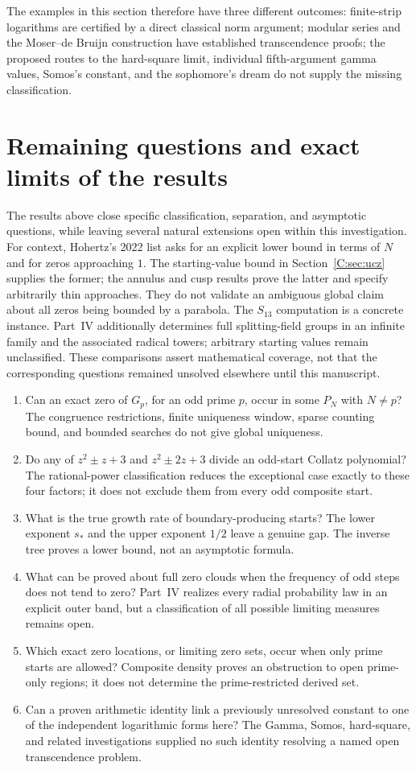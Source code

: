 \documentclass[11pt,a4paper]{article}
\theoremstyle{definition}
\theoremstyle{remark}
\numberwithin{equation}{section}
\begin{document}
The examples in this section therefore have three different outcomes:
finite-strip logarithms are certified by a direct classical norm argument;
modular series and the Moser--de Bruijn construction have established
transcendence proofs; the proposed routes to the hard-square limit,
individual fifth-argument gamma values, Somos's constant, and the
sophomore's dream do not supply the missing classification.


\section{Remaining questions and exact limits of the results}
\label{C:sec:remaining-questions}
The results above close specific classification, separation, and
asymptotic questions, while leaving several natural extensions open
within this investigation.
For context, Hohertz's 2022 list \cite[Section~5]{R005} asks for
an explicit lower bound in terms of $N$ and for zeros approaching $1$.
The starting-value bound in Section~\ref{C:sec:ucz} supplies the former;
the annulus and cusp results prove the latter and specify arbitrarily
thin approaches. They do not validate an ambiguous global claim about
all zeros being bounded by a parabola. The $S_{13}$ computation is a concrete instance. Part~IV additionally determines full splitting-field groups in an infinite family and the associated radical towers; arbitrary starting values remain unclassified. These comparisons assert mathematical coverage,
not that the corresponding questions remained unsolved elsewhere
until this manuscript.
\begin{enumerate}
\item Can an exact zero of $G_p$, for an odd prime $p$, occur in
some $P_N$ with $N\ne p$? The congruence restrictions, finite uniqueness
window, sparse counting bound, and bounded searches do not give global
uniqueness.
\item Do any of $z^2\pm z+3$ and $z^2\pm2z+3$ divide an odd-start
Collatz polynomial? The rational-power classification reduces the
exceptional case exactly to these four factors; it does not exclude
them from every odd composite start.
\item What is the true growth rate of boundary-producing starts?
The lower exponent $s_*$ and the upper exponent $1/2$ leave a genuine
gap. The inverse tree proves a lower bound, not an asymptotic formula.
\item What can be proved about full zero clouds when the frequency
of odd steps does not tend to zero? Part~IV realizes every radial probability law in an explicit outer band, but a classification of all possible limiting measures remains open.
\item Which exact zero locations, or limiting zero sets, occur when
only prime starts are allowed? Composite density proves an obstruction
to open prime-only regions; it does not determine the prime-restricted
derived set.
\item Can a proven arithmetic identity link a previously unresolved
constant to one of the independent logarithmic forms here? The Gamma,
Somos, hard-square, and related investigations supplied no such identity
resolving a named open transcendence problem.
\end{enumerate}
\end{document}
